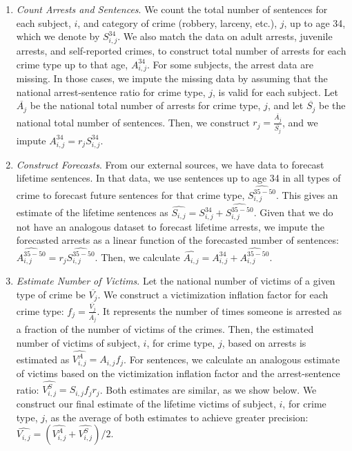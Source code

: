 \begin{enumerate}
\item \textit{Count Arrests and Sentences}. We count the total number of sentences for each subject, $i$, and category of crime (robbery, larceny, etc.), $j$, up to age 34,  which we denote by $S_{i,j}^{34}$. We also match the data on adult arrests, juvenile arrests, and self-reported crimes, to construct total number of  arrests for each crime type up to that age, $A_{i,j}^{34}$. For some subjects, the arrest data are missing. In those cases, we impute the missing data by assuming that the national arrest-sentence ratio for crime type, $j$, is valid for each subject. Let $\overline{A_j}$ be the national total number of arrests for crime type, $j$, and let $\overline{S_j}$ be the national total number of sentences. Then, we construct $r_j=\frac{\overline{A_j}}{\overline{S_j}}$, and we impute $A_{i,j}^{34}=r_j S_{i,j}^{34}$.

\item \textit{Construct Forecasts}. From our external sources, we have data to forecast lifetime sentences. In that data, we use sentences up to age 34 in all types of crime to forecast future sentences for that crime type, $\widehat{S_{i,j}^{35-50}}$. This gives an estimate of the lifetime sentences as $\widehat{S_{i,j}}=S_{i,j}^{34}+\widehat{S_{i,j}^{35-50}}$. Given that we do not have an analogous dataset to forecast lifetime arrests, we impute the forecasted arrests as a linear function of the forecasted number of sentences: $\widehat{A_{i,j}^{35-50}}=r_j \widehat{S_{i,j}^{35-50}}$. Then, we calculate $\widehat{A_{i,j}}=A_{i,j}^{34}+\widehat{A_{i,j}^{35-50}}$.

\item \textit{Estimate Number of Victims}. Let the national number of victims of a given type of crime be $\overline{V_j}$. We construct a victimization inflation factor for each crime type: $f_j=\frac{\overline{V_j}}{\overline{A_j}}$. It represents the number of times someone is arrested as a fraction of the number of victims of the crimes. Then, the estimated number of victims of subject, $i$, for crime type, $j$, based on arrests is estimated as $\widehat{V_{i,j}^{A}}=A_{i,j}f_j$. For sentences, we calculate an analogous estimate of victims based on the victimization inflation factor and the arrest-sentence ratio: $\widehat{V_{i,j}^{S}}=S_{i,j}f_j r_j$. Both estimates are similar, as we show below. We construct our final estimate of the lifetime victims of subject, $i$, for crime type, $j$, as the average of both estimates to achieve greater precision: $\widehat{V_{i,j}}=\left(\widehat{V_{i,j}^A}+\widehat{V_{i,j}^S}\right)/2$.


\end{enumerate}
